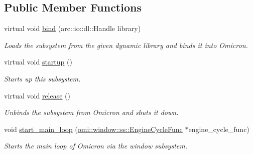 \subsection*{Public Member Functions}
\begin{DoxyCompactItemize}
\item 
virtual void \hyperlink{classomi_1_1runtime_1_1ss_1_1_window_subsystem_a31c8f26f08cc6475e4155470713fb440}{bind} (arc\+::io\+::dl\+::\+Handle library)\hypertarget{classomi_1_1runtime_1_1ss_1_1_window_subsystem_a31c8f26f08cc6475e4155470713fb440}{}\label{classomi_1_1runtime_1_1ss_1_1_window_subsystem_a31c8f26f08cc6475e4155470713fb440}

\begin{DoxyCompactList}\small\item\em Loads the subsystem from the given dynamic library and binds it into Omicron. \end{DoxyCompactList}\item 
virtual void \hyperlink{classomi_1_1runtime_1_1ss_1_1_window_subsystem_aa96c852ad0db077bacaabb55603cfcd1}{startup} ()\hypertarget{classomi_1_1runtime_1_1ss_1_1_window_subsystem_aa96c852ad0db077bacaabb55603cfcd1}{}\label{classomi_1_1runtime_1_1ss_1_1_window_subsystem_aa96c852ad0db077bacaabb55603cfcd1}

\begin{DoxyCompactList}\small\item\em Starts up this subsystem. \end{DoxyCompactList}\item 
virtual void \hyperlink{classomi_1_1runtime_1_1ss_1_1_window_subsystem_a86b3dbc5b0a67e77de1ca0cfe5cecbd8}{release} ()
\begin{DoxyCompactList}\small\item\em Unbinds the subsystem from Omicron and shuts it down. \end{DoxyCompactList}\item 
void \hyperlink{classomi_1_1runtime_1_1ss_1_1_window_subsystem_a0edb4d11599ffafd6fd8d281dbeb5571}{start\+\_\+main\+\_\+loop} (\hyperlink{namespaceomi_1_1window_1_1ss_af42d2464a170bdfd876a35b9fde16137}{omi\+::window\+::ss\+::\+Engine\+Cycle\+Func} $\ast$engine\+\_\+cycle\+\_\+func)\hypertarget{classomi_1_1runtime_1_1ss_1_1_window_subsystem_a0edb4d11599ffafd6fd8d281dbeb5571}{}\label{classomi_1_1runtime_1_1ss_1_1_window_subsystem_a0edb4d11599ffafd6fd8d281dbeb5571}

\begin{DoxyCompactList}\small\item\em Starts the main loop of Omicron via the window subsystem. \end{DoxyCompactList}\end{DoxyCompactItemize}


